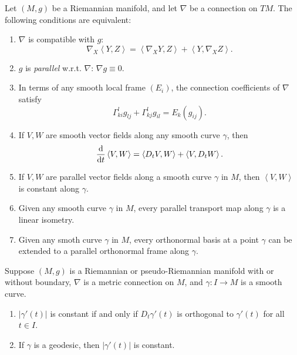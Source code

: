 \begin{proposition}
  \label{proposition-characterizations-metric-connections}
  Let \( (M, g) \) be a Riemannian manifold, and let \( \nabla \) be a connection on \( TM \).
  The following conditions are equivalent:
  \begin{enumerate}
    \item \( \nabla \) is compatible with \( g \):
      \[
        \nabla_X \left\langle Y, Z \right\rangle = \left\langle \nabla_X Y, Z \right\rangle + \left\langle Y, \nabla_X Z \right\rangle.
      \]
    \item \( g \) is \emph{parallel} w.r.t. \( \nabla \): \( \nabla g \equiv 0 \).
    \item In terms of any smooth local frame \( (E_i) \), the connection coefficients of \( \nabla \) satisfy
      \[
        \Gamma^l_{ki}g_{lj} + \Gamma^l_{kj}g_{il} = E_k (g_{ij}).
      \]
    \item If \( V, W \) are smooth vector fields along any smooth curve \( \gamma \), then
      \[
        \frac{\mathop{}\!\mathrm{d}}{\mathop{}\!\mathrm{d} t} \left\langle V, W \right\rangle = \left\langle D_t V, W \right\rangle + \left\langle V, D_t W \right\rangle.
      \]
    \item If \( V, W \) are parallel vector fields along a smooth curve \( \gamma \) in \( M \), then \( \left\langle V, W \right\rangle \) is constant along \( \gamma \).
    \item Given any smooth curve \( \gamma \) in \( M \), every parallel transport map along \( \gamma \) is a linear isometry.
    \item Given any smoth curve \( \gamma \) in \( M \), every orthonormal basis at a point \( \gamma \) can be extended to a parallel orthonormal frame along \( \gamma \).
  \end{enumerate}
\end{proposition}

\begin{corollary}
  \label{corollary-characterizations-metric-connections}
  Suppose \( (M, g) \) is a Riemannian or pseudo-Riemannian manifold with or without boundary, \( \nabla \) is a metric connection on \( M \), and \( \gamma: I \to M \) is a smooth curve.
  \begin{enumerate}
    \item \( \left\lvert \gamma'(t) \right\rvert \) is constant if and only if \( D_t \gamma'(t) \) is orthogonal to \( \gamma'(t) \) for all \( t \in I \).
    \item If \( \gamma \) is a geodesic, then \( \left\lvert \gamma'(t) \right\rvert \) is constant.
  \end{enumerate}
\end{corollary}

